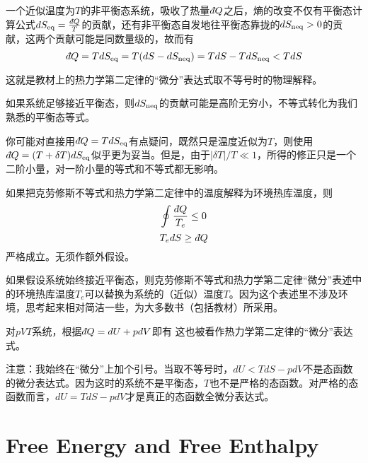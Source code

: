 \documentclass[CJK]{beamer}
\begin{document}
\begin{frame}
\bch
一个近似温度为$T$的非平衡态系统，吸收了热量$\dbar Q$之后，熵的改变不仅有平衡态计算公式$dS_{\rm eq} = \frac{\dbar Q}{T}$的贡献，还有非平衡态自发地往平衡态靠拢的$dS_{\rm neq}>0$的贡献，这两个贡献可能是同数量级的，故而有
$$\dbar Q = T dS_{\rm eq} = T(dS - dS_{\rm neq}) = TdS- TdS_{\rm neq} < TdS$$

\skipline

这就是教材上的热力学第二定律的“微分”表达式取不等号时的物理解释。

如果系统足够接近平衡态，则$dS_{\rm neq}$的贡献可能是高阶无穷小，不等式转化为我们熟悉的平衡态等式。

\skipline

{\scriptsize 你可能对直接用$\dbar Q = TdS_{\rm eq} $有点疑问，既然只是温度近似为$T$，则使用
$\dbar Q = (T+\delta T) dS_{\rm eq}$似乎更为妥当。但是，由于$|\delta T|/T\ll 1$，所得的修正只是一个二阶小量，对一阶小量的等式和不等式都无影响。}

\ech
\end{frame}

\begin{frame}
\bch
如果把克劳修斯不等式和热力学第二定律中的温度解释为环境热库温度，则
{\blue $$\oint \frac{\dbar Q}{T_e} \le 0 $$
$$ T_edS \ge \dbar Q $$}
严格成立。无须作额外假设。

\skipline
如果假设系统始终接近平衡态，则克劳修斯不等式和热力学第二定律“微分”表述中的环境热库温度$T_e$可以替换为系统的（近似）温度$T$。因为这个表述里不涉及环境，思考起来相对简洁一些，为大多数书（包括教材）所采用。
\ech
\end{frame}


\begin{frame}
\bch
对$pVT$系统，根据$\dbar Q = dU + pdV$即有
这也被看作热力学第二定律的“微分”表达式。

\skiplines

{\scriptsize
注意：我始终在“微分”上加个引号。当取不等号时，$dU < TdS - pdV$不是态函数的微分表达式。因为这时的系统不是平衡态，$T$也不是严格的态函数。对严格的态函数而言，$dU = TdS - pdV$才是真正的态函数全微分表达式。}
\ech
\end{frame}

\section{Free Energy and Free Enthalpy}
\end{document}
